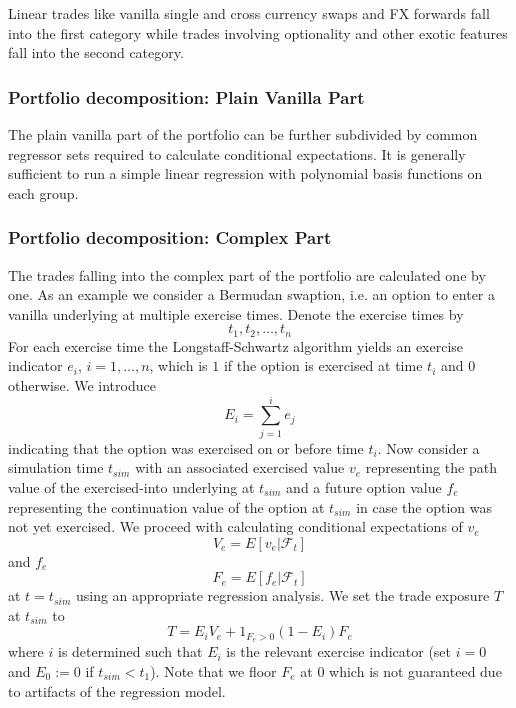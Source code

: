 \documentclass[11pt,a4paper,oneside]{article}
\begin{document}
Linear trades like vanilla single and cross currency swaps and FX forwards fall into the first category while trades
involving optionality and other exotic features fall into the second category.

\subsubsection*{Portfolio decomposition: Plain Vanilla Part}

The plain vanilla part of the portfolio can be further subdivided by common regressor sets required to calculate
conditional expectations. It is generally sufficient to run a simple linear regression with polynomial basis functions
on each group.

\subsubsection*{Portfolio decomposition: Complex Part}

The trades falling into the complex part of the portfolio are calculated one by one. As an example we consider a
Bermudan swaption, i.e. an option to enter a vanilla underlying at multiple exercise times. Denote the exercise times by
$$
t_1, t_2, \ldots, t_n 
$$
For each exercise time the Longstaff-Schwartz algorithm yields an exercise indicator $e_i$, $i=1,\ldots,n$, which is $1$
if the option is exercised at time $t_i$ and $0$ otherwise. We introduce
$$
E_i = \sum_{j=1}^i e_j
$$
indicating that the option was exercised on or before time $t_i$. Now consider a simulation time $t_{sim}$ with an
associated exercised value $v_e$ representing the path value of the exercised-into underlying at $t_{sim}$ and a
future option value $f_e$ representing the continuation value of the option at $t_{sim}$ in case the option was not
yet exercised. We proceed with calculating conditional expectations of $v_e$
\begin{equation}\label{aad:calc1}
V_e = E\left[ v_e | \mathcal{F}_t \right]
\end{equation}
and $f_e$
\begin{equation}\label{aad:calc2}
F_e = E\left[ f_e | \mathcal{F}_t \right]
\end{equation}
at $t = t_{sim}$ using an appropriate regression analysis. We set the trade exposure $T$ at $t_{sim}$ to
\begin{equation}\label{aad:calc3}
T = E_i V_e + 1_{F_e > 0} (1 - E_i) F_e
\end{equation}
where $i$ is determined such that $E_i$ is the relevant exercise indicator (set $i=0$ and $E_0 := 0$ if $t_{sim} <
t_1$). Note that we floor $F_e$ at $0$ which is not guaranteed due to artifacts of the regression model.
\end{document}
